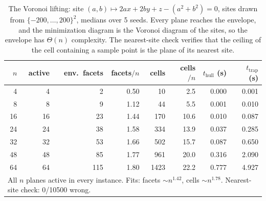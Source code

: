 \begin{table}[htbp]
\centering
\begin{tabular}{rrrrrrrr}
\toprule
$n$ & active & env.\ facets & facets$/n$ & cells & cells$/n$ & $t_{\text{hull}}$ (s) & $t_{\text{trap}}$ (s) \\
\midrule
4 & 4 & 2 & 0.50 & 10 & 2.5 & 0.000 & 0.001 \\
8 & 8 & 9 & 1.12 & 44 & 5.5 & 0.001 & 0.010 \\
16 & 16 & 23 & 1.44 & 170 & 10.6 & 0.010 & 0.087 \\
24 & 24 & 38 & 1.58 & 334 & 13.9 & 0.037 & 0.285 \\
32 & 32 & 53 & 1.66 & 502 & 15.7 & 0.087 & 0.650 \\
48 & 48 & 85 & 1.77 & 961 & 20.0 & 0.316 & 2.090 \\
64 & 64 & 115 & 1.80 & 1423 & 22.2 & 0.777 & 4.927 \\
\midrule
\multicolumn{8}{l}{All $n$ planes active in every instance. Fits: facets ${\sim}n^{1.42}$, cells ${\sim}n^{1.78}$. Nearest-site check: 0/10500 wrong.} \\
\bottomrule
\end{tabular}
\caption{The Voronoi lifting: site $(a,b) \mapsto 2ax + 2by + z - (a^2{+}b^2) = 0$, sites drawn from $\{-200,\dots,200\}^2$, medians over 5 seeds. Every plane reaches the envelope, and the minimization diagram is the Voronoi diagram of the sites, so the envelope has $\Theta(n)$ complexity. The nearest-site check verifies that the ceiling of the cell containing a sample point is the plane of its nearest site.}
\label{tab:env-voronoi}
\end{table}
